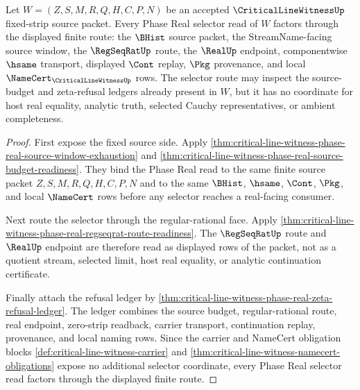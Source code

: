 \begin{theorem}
\label{thm:critical-line-witness-phase-real-selector-route-totality}
Let $W=(Z,S,M,R,Q,H,C,P,N)$ be an accepted $\CriticalLineWitnessUp$ fixed-strip source packet. Every Phase Real selector read of $W$ factors through the displayed finite route: the $\BHist$ source packet, the StreamName-facing source window, the $\RegSeqRatUp$ route, the $\RealUp$ endpoint, componentwise $\hsame$ transport, displayed $\Cont$ replay, $\Pkg$ provenance, and local $\NameCert_{\CriticalLineWitnessUp}$ rows. The selector route may inspect the source-budget and zeta-refusal ledgers already present in $W$, but it has no coordinate for host real equality, analytic truth, selected Cauchy representatives, or ambient completeness.
\end{theorem}
\begin{proof}
First expose the fixed source side. Apply \autoref{thm:critical-line-witness-phase-real-source-window-exhaustion} and \autoref{thm:critical-line-witness-phase-real-source-budget-readiness}. They bind the Phase Real read to the same finite source packet $Z,S,M,R,Q,H,C,P,N$ and to the same $\BHist$, $\hsame$, $\Cont$, $\Pkg$, and local $\NameCert$ rows before any selector reaches a real-facing consumer.

Next route the selector through the regular-rational face. Apply \autoref{thm:critical-line-witness-phase-real-regseqrat-route-readiness}. The $\RegSeqRatUp$ route and $\RealUp$ endpoint are therefore read as displayed rows of the packet, not as a quotient stream, selected limit, host real equality, or analytic continuation certificate.

Finally attach the refusal ledger by \autoref{thm:critical-line-witness-phase-real-zeta-refusal-ledger}. The ledger combines the source budget, regular-rational route, real endpoint, zero-strip readback, carrier transport, continuation replay, provenance, and local naming rows. Since the carrier and NameCert obligation blocks \autoref{def:critical-line-witness-carrier} and \autoref{thm:critical-line-witness-namecert-obligations} expose no additional selector coordinate, every Phase Real selector read factors through the displayed finite route.
\end{proof}

